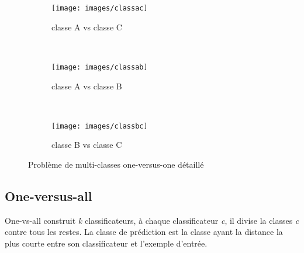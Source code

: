\begin{figure}[htbp!]
        \centering
        \begin{subfigure}[b]{0.3\textwidth}
                \texttt{[image: images/classac]}
                \caption{classe A vs classe C}
                \label{classac}
        \end{subfigure}%
        ~ %
        \begin{subfigure}[b]{0.3\textwidth}
                \texttt{[image: images/classab]}
                \caption{classe A vs classe B}
                \label{classab}
        \end{subfigure}
        ~ %
        \begin{subfigure}[b]{0.30\textwidth}
                \texttt{[image: images/classbc]}
                \caption{classe B vs classe C}
                \label{classbc}
        \end{subfigure}
        \caption{Problème de multi-classes one-versus-one détaillé}\label{1vs1detail}
\end{figure}


\subsection{One-versus-all}
One-vs-all construit \textit{k} classificateurs, à chaque classificateur \textit{c}, il divise la classes \textit{c} contre tous les restes. La classe de prédiction est la classe ayant la distance la plus courte entre son classificateur et l'exemple d'entrée.

